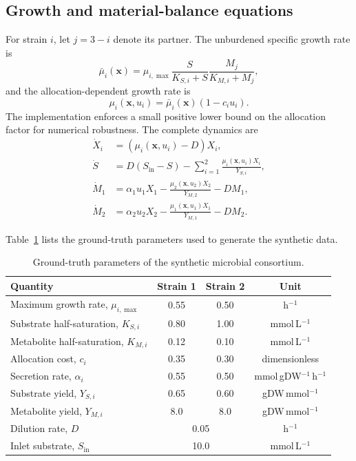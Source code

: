 \documentclass[11pt,a4paper]{article}
\newcommand{\vect}[1]{\boldsymbol{#1}}
\begin{document}
\subsection{Growth and material-balance equations}

For strain \(i\), let \(j=3-i\) denote its partner. The unburdened specific
growth rate is
\begin{equation}
  \bar{\mu}_i(\vect{x}) =
  \mu_{i,\max}
  \frac{S}{K_{S,i}+S}
  \frac{M_j}{K_{M,i}+M_j},
\end{equation}
and the allocation-dependent growth rate is
\begin{equation}
  \mu_i(\vect{x},u_i)=
  \bar{\mu}_i(\vect{x})(1-c_i u_i).
\end{equation}
The implementation enforces a small positive lower bound on the allocation
factor for numerical robustness. The complete dynamics are
\begin{align}
  \dot X_i &=
  \left(\mu_i(\vect{x},u_i)-D\right)X_i, \label{eq:biomass}\\
  \dot S &=
  D(S_{\mathrm{in}}-S)
  -\sum_{i=1}^{2}\frac{\mu_i(\vect{x},u_i)X_i}{Y_{S,i}},
  \label{eq:substrate}\\
  \dot M_1 &=
  \alpha_1u_1X_1
  -\frac{\mu_2(\vect{x},u_2)X_2}{Y_{M,2}}
  -DM_1,\\
  \dot M_2 &=
  \alpha_2u_2X_2
  -\frac{\mu_1(\vect{x},u_1)X_1}{Y_{M,1}}
  -DM_2. \label{eq:metabolites}
\end{align}

Table~\ref{tab:parameters} lists the ground-truth parameters used to generate
the synthetic data.

\begin{table}[H]
\centering
\caption{Ground-truth parameters of the synthetic microbial consortium.}
\label{tab:parameters}
\begin{tabular}{lccc}
\toprule
Quantity & Strain 1 & Strain 2 & Unit\\
\midrule
Maximum growth rate, \(\mu_{i,\max}\) & 0.55 & 0.50 & h\(^{-1}\)\\
Substrate half-saturation, \(K_{S,i}\) & 0.80 & 1.00 & mmol\,L\(^{-1}\)\\
Metabolite half-saturation, \(K_{M,i}\) & 0.12 & 0.10 & mmol\,L\(^{-1}\)\\
Allocation cost, \(c_i\) & 0.35 & 0.30 & dimensionless\\
Secretion rate, \(\alpha_i\) & 0.55 & 0.50 &
  mmol\,gDW\(^{-1}\)\,h\(^{-1}\)\\
Substrate yield, \(Y_{S,i}\) & 0.65 & 0.60 & gDW\,mmol\(^{-1}\)\\
Metabolite yield, \(Y_{M,i}\) & 8.0 & 8.0 & gDW\,mmol\(^{-1}\)\\
\midrule
Dilution rate, \(D\) & \multicolumn{2}{c}{0.05} & h\(^{-1}\)\\
Inlet substrate, \(S_{\mathrm{in}}\) & \multicolumn{2}{c}{10.0} &
  mmol\,L\(^{-1}\)\\
\bottomrule
\end{tabular}
\end{table}
\end{document}
